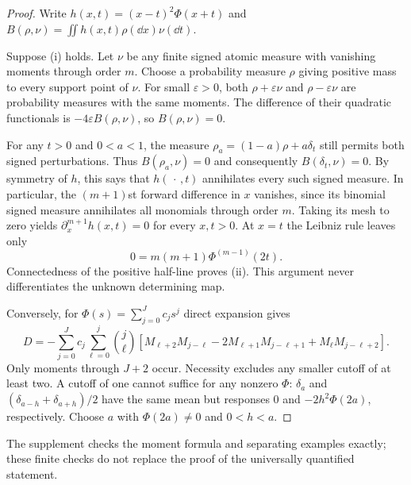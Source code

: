\documentclass[11pt]{article}
\begin{document}
\begin{proof}
Write $h(x,t)=(x-t)^2\Phi(x+t)$ and
$B(\rho,\nu)=\iint h(x,t)\rho(\dd x)\nu(\dd t)$.

Suppose (i) holds. Let $\nu$ be any finite signed atomic measure with
vanishing moments through order $m$. Choose a probability measure $\rho$
giving positive mass to every support point of $\nu$. For small
$\varepsilon>0$, both $\rho+\varepsilon\nu$ and
$\rho-\varepsilon\nu$ are probability measures with the same moments.
The difference of their quadratic functionals is
$-4\varepsilon B(\rho,\nu)$, so $B(\rho,\nu)=0$.

For any $t>0$ and $0<a<1$, the measure
$\rho_a=(1-a)\rho+a\delta_t$ still permits both signed perturbations.
Thus $B(\rho_a,\nu)=0$ and consequently $B(\delta_t,\nu)=0$.
By symmetry of $h$, this says that $h(\,\cdot\,,t)$ annihilates every such
signed measure. In particular, the $(m+1)$st forward difference in $x$
vanishes, since its binomial signed measure annihilates all monomials
through order $m$. Taking its mesh to zero yields
$\partial_x^{m+1}h(x,t)=0$ for every $x,t>0$.
At $x=t$ the Leibniz rule leaves only
\[
 0=m(m+1)\Phi^{(m-1)}(2t).
\]
Connectedness of the positive half-line proves (ii).
This argument never differentiates the unknown determining map.

Conversely, for $\Phi(s)=\sum_{j=0}^J c_js^j$ direct expansion gives
\begin{equation}\label{eq:moment}
 D=-\sum_{j=0}^Jc_j\sum_{\ell=0}^j\binom j\ell
 \left[M_{\ell+2}M_{j-\ell}
       -2M_{\ell+1}M_{j-\ell+1}
       +M_\ell M_{j-\ell+2}\right].
\end{equation}
Only moments through $J+2$ occur. Necessity excludes any smaller cutoff
of at least two. A cutoff of one cannot suffice for any nonzero $\Phi$:
$\delta_a$ and $(\delta_{a-h}+\delta_{a+h})/2$ have the same mean but
responses $0$ and $-2h^2\Phi(2a)$, respectively. Choose $a$ with
$\Phi(2a)\ne0$ and $0<h<a$.
\end{proof}

The supplement \cite{Internal} checks the moment formula and separating
examples exactly; these finite checks do not replace the proof of the
universally quantified statement.
\end{document}

